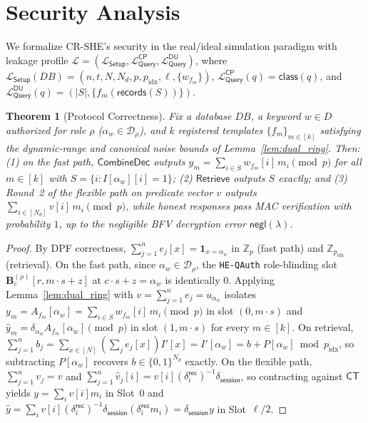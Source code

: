 \documentclass[11pt,a4paper]{article}
\newtheorem{theorem}{Theorem}
\begin{document}
\section{Security Analysis}\label{sec:security}

We formalize CR-SHE's security in the real/ideal simulation paradigm with leakage profile $\mathcal{L} = (\mathcal{L}_{\mathsf{Setup}}, \mathcal{L}^{\mathsf{CP}}_{\mathsf{Query}}, \mathcal{L}^{\mathsf{DU}}_{\mathsf{Query}})$, where $\mathcal{L}_{\mathsf{Setup}}(DB) = (n, t, N, N_d, p, p_{\mathrm{idx}}, \ell, \{w_{f_m}\})$, $\mathcal{L}^{\mathsf{CP}}_{\mathsf{Query}}(q) = \mathsf{class}(q)$, and $\mathcal{L}^{\mathsf{DU}}_{\mathsf{Query}}(q) = (|S|, \{f_m(\mathsf{records}(S))\})$.

\begin{theorem}[Protocol Correctness]\label{thm:correctness}
Fix a database $DB$, a keyword $w \in D$ authorized for role $\rho$ ($\alpha_w \in \mathcal{D}_\rho$), and $k$ registered templates $\{f_m\}_{m \in [k]}$ satisfying the dynamic-range and canonical noise bounds of Lemma~\ref{lem:dual_ring}. Then: (1) on the fast path, $\mathsf{CombineDec}$ outputs $y_m = \sum_{i \in S} w_{f_m}[i]\, m_i \pmod p$ for all $m \in [k]$ with $S = \{i : I[\alpha_w][i] = 1\}$; (2) $\mathsf{Retrieve}$ outputs $S$ exactly; and (3) Round~2 of the flexible path on predicate vector $v$ outputs $\sum_{i \in [N_d]} v[i]\, m_i \pmod p$, while honest responses pass MAC verification with probability $1$, up to the negligible BFV decryption error $\mathsf{negl}(\lambda)$.
\end{theorem}

\begin{proof}
By DPF correctness, $\sum_{j=1}^n e_j[x] = \mathbf{1}_{x = \alpha_w}$ in $\mathbb{Z}_p$ (fast path) and $\mathbb{Z}_{p_{\mathrm{idx}}}$ (retrieval). On the fast path, since $\alpha_w \in \mathcal{D}_\rho$, the \texttt{HE-QAuth} role-blinding slot $\mathbf{B}_c^{(\rho)}[r, m\cdot s + z]$ at $c\cdot s + z = \alpha_w$ is identically $0$. Applying Lemma~\ref{lem:dual_ring} with $v = \sum_{j=1}^n e_j = u_{\alpha_w}$ isolates $y_m = A_{f_m}[\alpha_w] = \sum_{i \in S} w_{f_m}[i]\, m_i \pmod p$ in slot $(0, m\cdot s)$ and $\hat{y}_m = \delta_{\alpha_w} A_{f_m}[\alpha_w] \pmod p$ in slot $(1, m\cdot s)$ for every $m \in [k]$. On retrieval, $\sum_{j=1}^n b_j = \sum_{x \in [N]} (\sum_j e_j[x]) I'[x] = I'[\alpha_w] = b + P[\alpha_w] \bmod p_{\mathrm{idx}}$, so subtracting $P[\alpha_w]$ recovers $b \in \{0,1\}^{N_d}$ exactly. On the flexible path, $\sum_{j=1}^n v_j = v$ and $\sum_{j=1}^n \hat{v}_j[i] = v[i](\delta_i^{\mathsf{rec}})^{-1}\delta_{\mathsf{session}}$, so contracting against $\mathsf{CT}$ yields $y = \sum_i v[i]m_i$ in Slot~0 and $\hat{y} = \sum_i v[i](\delta_i^{\mathsf{rec}})^{-1}\delta_{\mathsf{session}}(\delta_i^{\mathsf{rec}} m_i) = \delta_{\mathsf{session}} y$ in Slot~$\ell/2$.
\end{proof}
\end{document}
